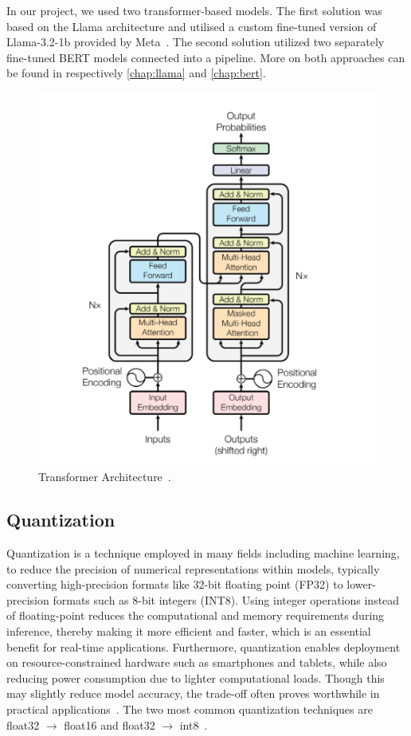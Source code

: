\documentclass[licencjacka,en]{pracamgr}
\begin{document}
In our project, we used two transformer-based models. The first solution was based on the Llama architecture and utilised a custom fine-tuned version of Llama-3.2-1b provided by Meta~\cite{meta-llama}.
The second solution utilized two separately fine-tuned BERT models connected into a pipeline. More on both approaches can be found in respectively \ref{chap:llama} and \ref{chap:bert}.


\begin{figure}
    \centering
    \includegraphics[width=0.5\linewidth]{bachelor_images/transformer_arch.png}
    \caption{Transformer Architecture~\cite{attention}.}
    \label{fig:transformers_fig}
\end{figure}

\subsection{Quantization}
Quantization is a technique employed in many fields including machine learning, to reduce the precision of numerical representations within models, typically converting high-precision formats like 32-bit floating point (FP32) to lower-precision formats such as 8-bit integers (INT8). Using integer operations instead of floating-point reduces the computational and memory requirements during inference, thereby making it more efficient and faster, which is an essential benefit for real-time applications. Furthermore, quantization enables deployment on resource-constrained hardware such as smartphones and tablets, while also reducing power consumption due to lighter computational loads. Though this may slightly reduce model accuracy, the trade-off often proves worthwhile in practical applications~\cite{ibm_quantization}.
The two most common quantization techniques are float32 $\rightarrow$ float16 and float32 $\rightarrow$ int8~\cite{quant_hf}.
\end{document}
